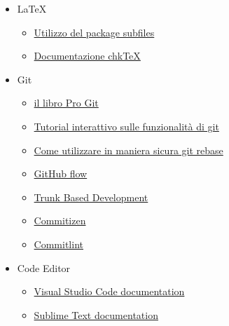 \documentclass[../norme-di-progetto.tex]{subfiles}
\begin{document}
\begin{itemize}
\item \LaTeX{}
\begin{itemize}
\item \href{https://www.overleaf.com/learn/latex/Multi-file_LaTeX_projects#The_subfiles_package}{Utilizzo del package subfiles}
\item \href{https://www.nongnu.org/chktex/ChkTeX.pdf}{Documentazione chk\TeX}
\end{itemize}

\item Git
\begin{itemize}
\item \href{https://git-scm.com/book/en/v2}{il libro Pro Git}
\item \href{https://learngitbranching.js.org/}{Tutorial interattivo sulle funzionalità di git}
\item \href{https://git-scm.com/book/en/v2/Git-Branching-Rebasing}{Come utilizzare in maniera sicura git rebase}
\item \href{https://guides.github.com/introduction/flow/}{GitHub flow}
\item \href{https://trunkbaseddevelopment.com/}{Trunk Based Development}
\item \href{https://commitizen.github.io/cz-cli/}{Commitizen}
\item \href{https://commitlint.js.org/}{Commitlint}
\end{itemize}

\item Code Editor
\begin{itemize}
\item \href{https://code.visualstudio.com/docs}{Visual Studio Code documentation}
\item \href{https://www.sublimetext.com/docs/3/}{Sublime Text documentation}
\end{itemize}


\end{itemize}
\end{document}
